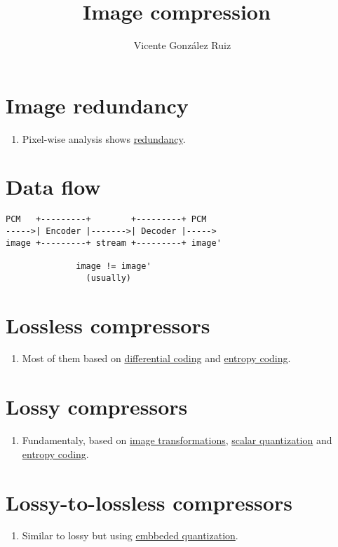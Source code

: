 
\title{Image compression~\cite{1991.rabbani}}

\author{Vicente González Ruiz}

\maketitle

\section{Image redundancy}
\begin{enumerate}
\item Pixel-wise analysis shows \href{https://vicente-gonzalez-ruiz.github.io/image_redundancies/}{redundancy}.
\end{enumerate}

\section{Data flow~\cite{sayood2017introduction}}

\begin{verbatim}
PCM   +---------+        +---------+ PCM
----->| Encoder |------->| Decoder |----->
image +---------+ stream +---------+ image'

              image != image'
                (usually)
\end{verbatim}

\section{Lossless compressors}
\begin{enumerate}
\item Most of them based on \href{https://vicente-gonzalez-ruiz.github.io/differential_coding/}{differential coding} and \href{https://vicente-gonzalez-ruiz.github.io/symbol_compression/}{entropy coding}.
\end{enumerate}

\section{Lossy compressors}
\begin{enumerate}
\item Fundamentaly, based on \href{https://vicente-gonzalez-ruiz.github.io/image_transformations_for_coding/}{image transformations}, \href{https://vicente-gonzalez-ruiz.github.io/quantization/}{scalar quantization} and \href{https://vicente-gonzalez-ruiz.github.io/symbol_compression/}{entropy coding}.
\end{enumerate}

\section{Lossy-to-lossless compressors}
\begin{enumerate}
\item Similar to lossy but using \href{}{embbeded quantization}.
\end{enumerate}


